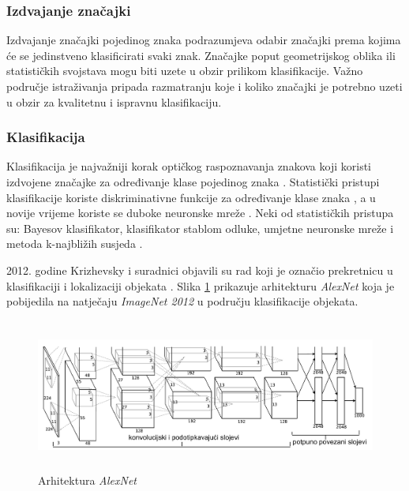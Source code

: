 \documentclass[times, utf8, zavrsni]{fer}
\begin{document}
\subsubsection{Izdvajanje značajki}

Izdvajanje značajki pojedinog znaka podrazumjeva odabir značajki prema kojima će
se jedinstveno klasificirati svaki znak. Značajke poput geometrijskog oblika ili
statističkih svojstava mogu biti uzete u obzir prilikom klasifikacije. Važno područje istraživanja pripada
razmatranju koje i koliko značajki je potrebno uzeti u obzir za kvalitetnu i ispravnu
klasifikaciju. \citep{DBLP:journals/corr/abs-1710-05703}

\subsubsection{Klasifikacija}

Klasifikacija je najvažniji korak optičkog raspoznavanja znakova \citep{verma2012survey} \citep{zhu2016novel}
koji koristi izdvojene značajke za određivanje klase pojedinog znaka \citep{lehal1999feature} \citep{kaur2016survey}.
Statistički pristupi klasifikacije koriste diskriminativne funkcije za određivanje klase znaka \citep{DBLP:journals/corr/abs-1710-05703},
a u novije vrijeme koriste se duboke neuronske mreže \citep{Jurin:2017:Master}.
Neki od statističkih pristupa su: Bayesov klasifikator, klasifikator stablom odluke, umjetne neuronske mreže i
metoda k-najbližih susjeda \citep{DBLP:journals/corr/abs-1710-05703}.

2012. godine Krizhevsky i suradnici \citep{krizhevsky2012imagenet} objavili su rad koji je
označio prekretnicu u klasifikaciji i lokalizaciji objekata \citep{Jurin:2017:Master}. Slika
\ref{fig:deep-example-01} prikazuje arhitekturu \emph{AlexNet} koja je pobijedila na natječaju
\emph{ImageNet 2012} u području klasifikacije objekata. \citep{Jurin:2017:Master}

\begin{figure}[htb]
    \centering
    \includegraphics[height=5cm]{images/deep-example-01.png}
    \caption{Arhitektura \emph{AlexNet} \citep{Jurin:2017:Master}}
    \label{fig:deep-example-01}
\end{figure}
\end{document}
